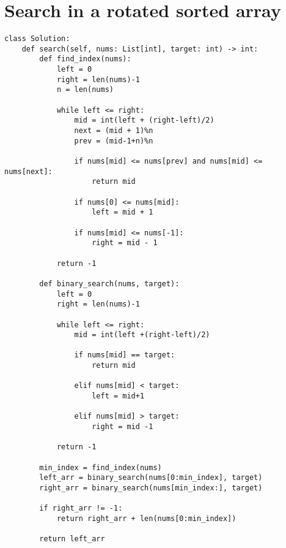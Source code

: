 \documentclass[24pt, a4]{article}
\begin{document}
\section{Search in a rotated sorted array}
\begin{lstlisting}
class Solution:
    def search(self, nums: List[int], target: int) -> int:
        def find_index(nums):
            left = 0
            right = len(nums)-1
            n = len(nums)
            
            while left <= right:
                mid = int(left + (right-left)/2)
                next = (mid + 1)%n
                prev = (mid-1+n)%n
                
                if nums[mid] <= nums[prev] and nums[mid] <= nums[next]:
                    return mid
                
                if nums[0] <= nums[mid]:
                    left = mid + 1
                
                if nums[mid] <= nums[-1]:
                    right = mid - 1
                
            return -1
        
        def binary_search(nums, target):
            left = 0 
            right = len(nums)-1
            
            while left <= right:
                mid = int(left +(right-left)/2)
                
                if nums[mid] == target:
                    return mid
                
                elif nums[mid] < target:
                    left = mid+1
                
                elif nums[mid] > target:
                    right = mid -1
            
            return -1
        
        min_index = find_index(nums)
        left_arr = binary_search(nums[0:min_index], target)
        right_arr = binary_search(nums[min_index:], target)
        
        if right_arr != -1:
            return right_arr + len(nums[0:min_index])
        
        return left_arr
\end{lstlisting}
\end{document}
